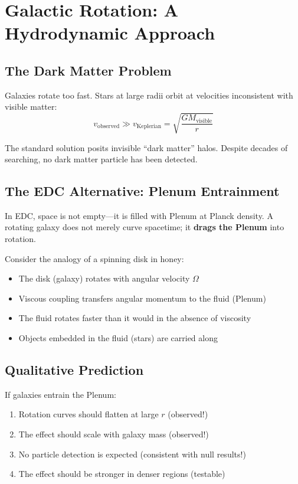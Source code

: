 \section{Galactic Rotation: A Hydrodynamic Approach}
\label{sec:dark_matter}

\subsection{The Dark Matter Problem}

Galaxies rotate too fast. Stars at large radii orbit at velocities inconsistent with visible matter:
\begin{equation}
v_{\text{observed}} \gg v_{\text{Keplerian}} = \sqrt{\frac{GM_{\text{visible}}}{r}}
\end{equation}

The standard solution posits invisible ``dark matter'' halos. Despite decades of searching, no dark matter particle has been detected.

\subsection{The EDC Alternative: Plenum Entrainment}

In EDC, space is not empty---it is filled with Plenum at Planck density. A rotating galaxy does not merely curve spacetime; it \textbf{drags the Plenum} into rotation.

Consider the analogy of a spinning disk in honey:
\begin{itemize}
    \item The disk (galaxy) rotates with angular velocity $\Omega$
    \item Viscous coupling transfers angular momentum to the fluid (Plenum)
    \item The fluid rotates faster than it would in the absence of viscosity
    \item Objects embedded in the fluid (stars) are carried along
\end{itemize}

\subsection{Qualitative Prediction}

If galaxies entrain the Plenum:
\begin{enumerate}
    \item Rotation curves should flatten at large $r$ (observed!)
    \item The effect should scale with galaxy mass (observed!)
    \item No particle detection is expected (consistent with null results!)
    \item The effect should be stronger in denser regions (testable)
\end{enumerate}

